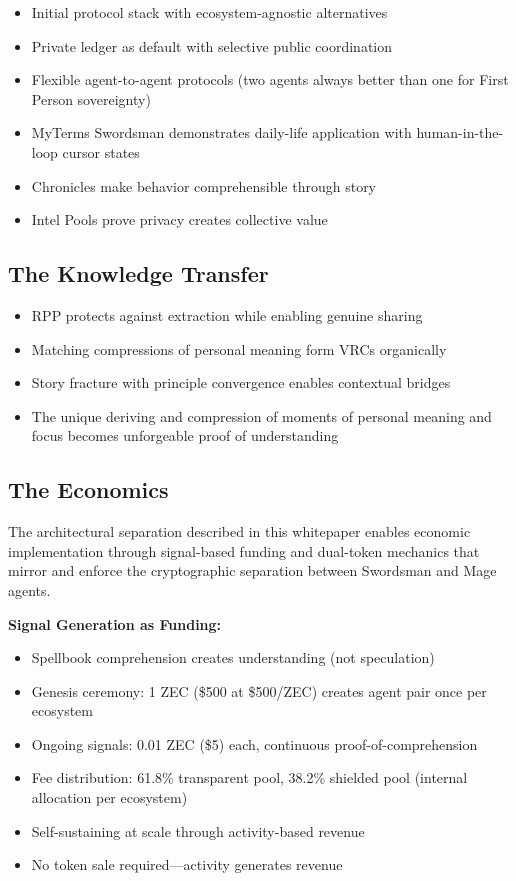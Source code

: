 \documentclass[11pt,a4paper]{article}
\theoremstyle{definition}
\begin{document}
\begin{itemize}
    \item Initial protocol stack with ecosystem-agnostic alternatives
    \item Private ledger as default with selective public coordination
    \item Flexible agent-to-agent protocols (two agents always better than one for First Person sovereignty)
    \item MyTerms Swordsman demonstrates daily-life application with human-in-the-loop cursor states
    \item Chronicles make behavior comprehensible through story
    \item Intel Pools prove privacy creates collective value
\end{itemize}

\subsection{The Knowledge Transfer}

\begin{itemize}
    \item RPP protects against extraction while enabling genuine sharing
    \item Matching compressions of personal meaning form VRCs organically
    \item Story fracture with principle convergence enables contextual bridges
    \item The unique deriving and compression of moments of personal meaning and focus becomes unforgeable proof of understanding
\end{itemize}

\subsection{The Economics}

The architectural separation described in this whitepaper enables economic implementation through signal-based funding and dual-token mechanics that mirror and enforce the cryptographic separation between Swordsman and Mage agents.

\textbf{Signal Generation as Funding:}

\begin{itemize}
    \item Spellbook comprehension creates understanding (not speculation)
    \item Genesis ceremony: 1 ZEC (\$500 at \$500/ZEC) creates agent pair once per ecosystem
    \item Ongoing signals: 0.01 ZEC (\$5) each, continuous proof-of-comprehension
    \item Fee distribution: 61.8\% transparent pool, 38.2\% shielded pool (internal allocation per ecosystem)
    \item Self-sustaining at scale through activity-based revenue
    \item No token sale required---activity generates revenue
\end{itemize}
\end{document}
